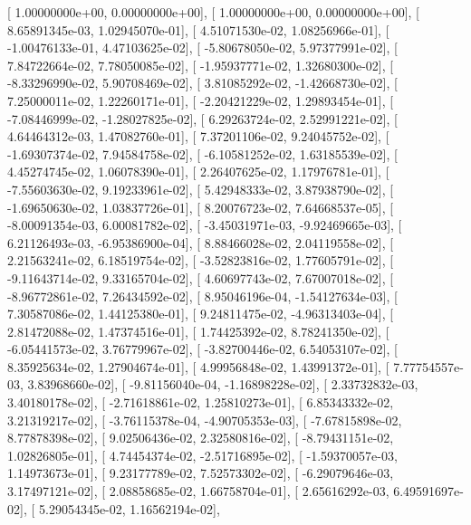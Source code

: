 \documentclass{article}
\begin{document}
       [  1.00000000e+00,   0.00000000e+00],
       [  1.00000000e+00,   0.00000000e+00],
       [  8.65891345e-03,   1.02945070e-01],
       [  4.51071530e-02,   1.08256966e-01],
       [ -1.00476133e-01,   4.47103625e-02],
       [ -5.80678050e-02,   5.97377991e-02],
       [  7.84722664e-02,   7.78050085e-02],
       [ -1.95937771e-02,   1.32680300e-02],
       [ -8.33296990e-02,   5.90708469e-02],
       [  3.81085292e-02,  -1.42668730e-02],
       [  7.25000011e-02,   1.22260171e-01],
       [ -2.20421229e-02,   1.29893454e-01],
       [ -7.08446999e-02,  -1.28027825e-02],
       [  6.29263724e-02,   2.52991221e-02],
       [  4.64464312e-03,   1.47082760e-01],
       [  7.37201106e-02,   9.24045752e-02],
       [ -1.69307374e-02,   7.94584758e-02],
       [ -6.10581252e-02,   1.63185539e-02],
       [  4.45274745e-02,   1.06078390e-01],
       [  2.26407625e-02,   1.17976781e-01],
       [ -7.55603630e-02,   9.19233961e-02],
       [  5.42948333e-02,   3.87938790e-02],
       [ -1.69650630e-02,   1.03837726e-01],
       [  8.20076723e-02,   7.64668537e-05],
       [ -8.00091354e-03,   6.00081782e-02],
       [ -3.45031971e-03,  -9.92469665e-03],
       [  6.21126493e-03,  -6.95386900e-04],
       [  8.88466028e-02,   2.04119558e-02],
       [  2.21563241e-02,   6.18519754e-02],
       [ -3.52823816e-02,   1.77605791e-02],
       [ -9.11643714e-02,   9.33165704e-02],
       [  4.60697743e-02,   7.67007018e-02],
       [ -8.96772861e-02,   7.26434592e-02],
       [  8.95046196e-04,  -1.54127634e-03],
       [  7.30587086e-02,   1.44125380e-01],
       [  9.24811475e-02,  -4.96313403e-04],
       [  2.81472088e-02,   1.47374516e-01],
       [  1.74425392e-02,   8.78241350e-02],
       [ -6.05441573e-02,   3.76779967e-02],
       [ -3.82700446e-02,   6.54053107e-02],
       [  8.35925634e-02,   1.27904674e-01],
       [  4.99956848e-02,   1.43991372e-01],
       [  7.77754557e-03,   3.83968660e-02],
       [ -9.81156040e-04,  -1.16898228e-02],
       [  2.33732832e-03,   3.40180178e-02],
       [ -2.71618861e-02,   1.25810273e-01],
       [  6.85343332e-02,   3.21319217e-02],
       [ -3.76115378e-04,  -4.90705353e-03],
       [ -7.67815898e-02,   8.77878398e-02],
       [  9.02506436e-02,   2.32580816e-02],
       [ -8.79431151e-02,   1.02826805e-01],
       [  4.74454374e-02,  -2.51716895e-02],
       [ -1.59370057e-03,   1.14973673e-01],
       [  9.23177789e-02,   7.52573302e-02],
       [ -6.29079646e-03,   3.17497121e-02],
       [  2.08858685e-02,   1.66758704e-01],
       [  2.65616292e-03,   6.49591697e-02],
       [  5.29054345e-02,   1.16562194e-02],
\end{document}
